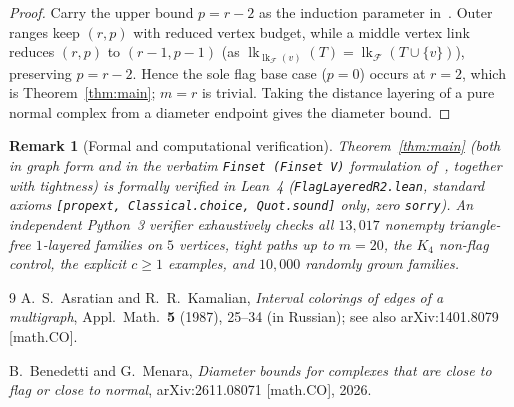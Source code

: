 \documentclass[11pt]{article}
\newtheorem{remark}[theorem]{Remark}
\DeclareMathOperator{\lk}{lk}
\begin{document}
\begin{proof}
Carry the upper bound $p = r - 2$ as the induction parameter in~\cite[Lemma~7.2]{BM2026}. Outer ranges keep $(r, p)$ with reduced vertex budget, while a middle vertex link reduces $(r, p)$ to $(r - 1, p - 1)$ (as $\lk_{\lk_{\mathcal{F}}(v)}(T) = \lk_{\mathcal{F}}(T \cup \{v\})$), preserving $p = r - 2$. Hence the sole flag base case ($p = 0$) occurs at $r = 2$, which is Theorem~\ref{thm:main}; $m = r$ is trivial. Taking the distance layering of a pure normal complex from a diameter endpoint gives the diameter bound.
\end{proof}

\begin{remark}[Formal and computational verification]
Theorem~\ref{thm:main} (both in graph form and in the verbatim \texttt{Finset (Finset V)} formulation of~\cite{BM2026}, together with tightness) is formally verified in Lean~4 (\texttt{FlagLayeredR2.lean}, standard axioms \texttt{[propext, Classical.choice, Quot.sound]} only, zero \texttt{sorry}). An independent Python~3 verifier exhaustively checks all $13{,}017$ nonempty triangle-free $1$-layered families on $5$ vertices, tight paths up to $m = 20$, the $K_4$ non-flag control, the explicit $c \ge 1$ examples, and $10{,}000$ randomly grown families.
\end{remark}

\begin{thebibliography}{9}
A.~S.~Asratian and R.~R.~Kamalian, \emph{Interval colorings of edges of a multigraph}, Appl.\ Math.\ \textbf{5} (1987), 25--34 (in Russian); see also arXiv:1401.8079 [math.CO].

B.~Benedetti and G.~Menara, \emph{Diameter bounds for complexes that are close to flag or close to normal}, arXiv:2611.08071 [math.CO], 2026.
\end{thebibliography}
\end{document}
